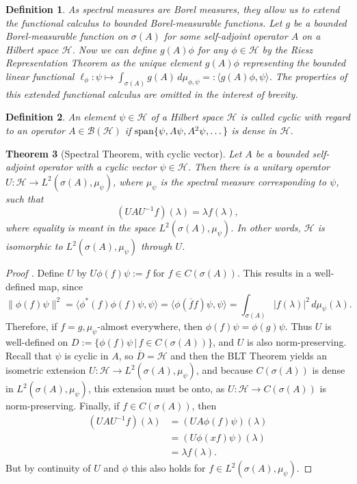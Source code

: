 \documentclass[12pt,oneside]{report}
\newtheorem{thm}{Theorem}[chapter]
\newtheorem{defn}[thm]{Definition}
\begin{document}
\begin{defn}\label{measurable-func-calc}
    As spectral measures are Borel measures, they allow us to extend the functional calculus to bounded Borel-measurable functions. Let $g$ be a bounded Borel-measurable function on $\sigma(A)$ for some self-adjoint operator $A$ on a Hilbert space $\mathscr{H}$. Now we can define $g(A)\phi$ for any $\phi \in \mathscr{H}$ by the Riesz Representation Theorem as the unique element $g(A)\phi$ representing the bounded linear functional $\ell_\phi: \psi \mapsto \int_{\sigma(A)} g(A) \, d\mu_{\phi,\psi} =: \langle g(A)\phi, \psi \rangle$. The properties of this extended functional calculus are omitted in the interest of brevity.
\end{defn}

\begin{defn}
    An element $\psi \in \mathscr{H}$ of a Hilbert space $\mathscr{H}$ is called cyclic with regard to an operator $A \in \mathscr{B}(\mathscr{H})$ if $\mathrm{span}\{ \psi, A\psi, A^{2}\psi, \dots \}$ is dense in $\mathscr{H}$.
\end{defn}

\begin{thm}[Spectral Theorem, with cyclic vector]\label{spectral-mo}
    Let $A$ be a bounded self-adjoint operator with a cyclic vector $\psi \in \mathscr{H}$. Then there is a unitary operator $U: \mathscr{H} \to L^{2}(\sigma(A),\mu_{\psi})$, where $\mu_{\psi}$ is the spectral measure corresponding to $\psi$, such that $$(UAU^{-1}f)(\lambda) = \lambda f(\lambda),$$where equality is meant in the space $L^{2}(\sigma(A),\mu_{\psi})$. In other words, $\mathscr{H}$ is isomorphic to $L^2(\sigma(A),\mu_\psi)$ through $U$.
\end{thm}
\begin{proof}[Proof \cite{Reed_Simon_1980}]
    Define $U$ by $U\phi(f)\psi := f$ for $f \in C(\sigma(A))$. This results in a well-defined map, since $$\|\phi(f)\psi\|^{2} = \langle \phi^{*}(f)\phi(f)\psi, \psi \rangle = \langle \phi(\overline{f}f)\psi, \psi \rangle = \int _{\sigma(A)} |f(\lambda)|^{2} \, d\mu_{\psi}(\lambda).$$ Therefore, if $f=g, \mu_{\psi}$-almost everywhere, then $\phi(f)\psi = \phi(g)\psi$. Thus $U$ is well-defined on $D := \{ \phi(f)\psi \, | \, f \in C(\sigma(A)) \}$, and $U$ is also norm-preserving. Recall that $\psi$ is cyclic in $A$, so $\overline{D} = \mathscr{H}$ and then the BLT Theorem yields an isometric extension $U: \mathscr{H} \to L^{2}(\sigma(A), \mu_{\psi})$, and because $C(\sigma(A))$ is dense in $L^{2}(\sigma(A),\mu_{\psi})$, this extension must be onto, as $U: \mathscr{H} \to C(\sigma(A))$ is norm-preserving. Finally, if $f \in C(\sigma(A))$, then \begin{align*}
        (UAU^{-1}f)(\lambda) &= (UA\phi(f)\psi)(\lambda) \\
        &= (U\phi(xf)\psi)(\lambda) \\
        &= \lambda f(\lambda).
    \end{align*} But by continuity of $U$ and $\phi$ this also holds for $f \in L^{2}(\sigma(A),\mu_{\psi})$.
\end{proof}
\end{document}
